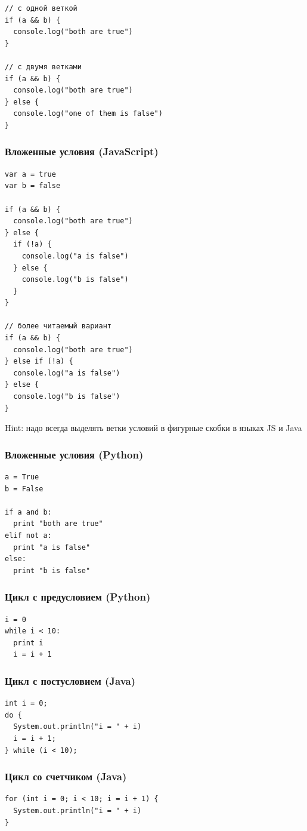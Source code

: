 {\begin{frame}[fragile]
\begin{verbatim}
// с одной веткой
if (a && b) {
  console.log("both are true")
}

// с двумя ветками
if (a && b) {
  console.log("both are true")
} else {
  console.log("one of them is false")
}
  \end{verbatim}
\end{frame}

\begin{frame}[fragile]
\frametitle{Вложенные условия (JavaScript)}
  \begin{verbatim}
var a = true
var b = false

if (a && b) {
  console.log("both are true")
} else {
  if (!a) {
    console.log("a is false")
  } else {
    console.log("b is false")
  }
}

// более читаемый вариант
if (a && b) {
  console.log("both are true")
} else if (!a) {
  console.log("a is false")
} else {
  console.log("b is false")
}
  \end{verbatim}
  Hint: надо всегда выделять ветки условий в фигурные скобки в языках JS и Java
\end{frame}

\begin{frame}[fragile]
\frametitle{Вложенные условия (Python)}
  \begin{verbatim}
a = True
b = False

if a and b:
  print "both are true"
elif not a:
  print "a is false"
else:
  print "b is false"
  \end{verbatim}
\end{frame}

\begin{frame}[fragile]
\frametitle{Цикл с предусловием (Python)}
  \begin{verbatim}
i = 0
while i < 10:
  print i
  i = i + 1
  \end{verbatim}
\end{frame}

\begin{frame}[fragile]
  \frametitle{Цикл с постусловием (Java)}
  \begin{verbatim}
int i = 0;
do {
  System.out.println("i = " + i)
  i = i + 1;
} while (i < 10);
  \end{verbatim}
\end{frame}

\begin{frame}[fragile]
  \frametitle{Цикл со счетчиком (Java)}
  \begin{verbatim}
for (int i = 0; i < 10; i = i + 1) {
  System.out.println("i = " + i)
}
  \end{verbatim}
\end{frame}

}
